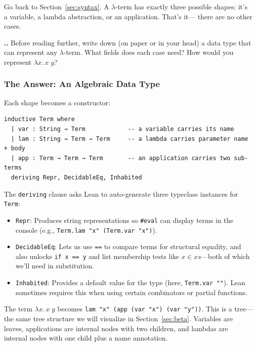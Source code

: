 \documentclass[11pt,a4paper]{article}
\newcounter{exercise}[section]
\renewcommand{\theexercise}{\thesection.\arabic{exercise}}
\theoremstyle{definition}
\newcommand{\lam}{\lambda}
\begin{document}
Go back to Section~\ref{sec:syntax}. A $\lam$-term has exactly three possible
shapes: it's a variable, a lambda abstraction, or an application. That's it---
there are no other cases.

\begin{exercisebox}
\textbf{\theexercise.}\; Before reading further, write down (on paper or in your head) a data type that can represent any $\lam$-term. What fields does each case need? How would you represent $\lam x.\, x\;y$?
\end{exercisebox}

\subsubsection{The Answer: An Algebraic Data Type}

Each shape becomes a constructor:

\begin{verbatim}
inductive Term where
  | var : String → Term            -- a variable carries its name
  | lam : String → Term → Term     -- a lambda carries parameter name + body
  | app : Term → Term → Term       -- an application carries two sub-terms
  deriving Repr, DecidableEq, Inhabited
\end{verbatim}

The \texttt{deriving} clause asks Lean to auto-generate three typeclass
instances for \texttt{Term}:

\begin{itemize}[leftmargin=2em]
\item \texttt{Repr}: Produces string representations so \texttt{\#eval} can
  display terms in the console (e.g., \texttt{Term.lam "x" (Term.var "x")}).
\item \texttt{DecidableEq}: Lets us use \texttt{==} to compare terms for
  structural equality, and also unlocks \texttt{if x == y} and list membership
  tests like $x \in \mathit{xs}$---both of which we'll need in substitution.
\item \texttt{Inhabited}: Provides a default value for the type (here,
  \texttt{Term.var ""}). Lean sometimes requires this when using certain
  combinators or partial functions.
\end{itemize}

The term $\lam x.\, x\;y$ becomes \texttt{lam "x" (app (var "x") (var "y"))}.
This is a tree---the same tree structure we will visualize in
Section~\ref{sec:beta}. Variables are leaves, applications are internal nodes
with two children, and lambdas are internal nodes with one child plus a name
annotation.
\end{document}
